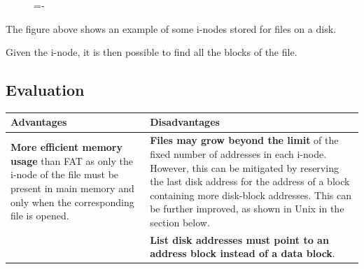 \documentclass[a4paper]{systems-software}
\begin{document}
\begin{figure}[H]
  \lineskip=-\fboxrule
\end{figure}

The figure above shows an example of some i-nodes stored for files on a disk.

Given the i-node, it is then possible to find all the blocks of the file.


\subsection*{Evaluation}

\begin{longtabu} to \textwidth {| X[1,l] | X[1,l] |}
    \hline
    \textbf{Advantages} & \textbf{Disadvantages}
	\\ \hline
	\textbf{More efficient memory usage} than FAT as only the i-node of the file must be present in main memory and only when the corresponding file is opened. &
	\textbf{Files may grow beyond the limit} of the fixed number of addresses in each i-node. However, this can be mitigated by reserving the last disk address for the address of a block containing more disk-block addresses. This can be further improved, as shown in Unix in the section below.
	\\ \hline
	& \textbf{List disk addresses must point to an address block instead of a data block}.
	\\ \hline
\end{longtabu}
\end{document}
